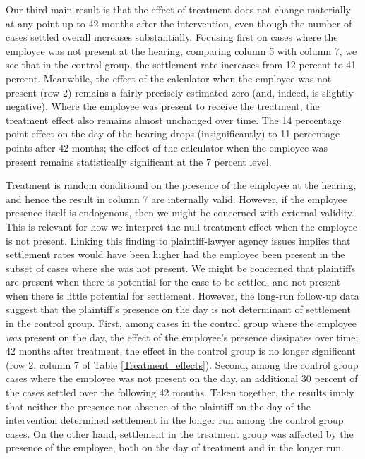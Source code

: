 \documentclass[11pt, a4paper]{article}
\begin{document}
Our third main result is that the effect of treatment does not change materially at any point up to 42 months after the intervention, even though the number of cases settled overall increases substantially. Focusing first on cases where the employee was not present at the hearing, comparing column 5 with column 7, we see that in the control group, the settlement rate increases from 12 percent to 41 percent. Meanwhile, the effect of the calculator when the employee was not present (row 2) remains a fairly precisely estimated zero (and, indeed, is slightly negative). Where the employee was present to receive the treatment, the treatment effect also remains almost unchanged over time. The 14 percentage point effect on the day of the hearing drops (insignificantly) to 11 percentage points after 42 months; the effect of the calculator when the employee was present remains statistically significant at the 7 percent level.

Treatment is random conditional on the presence of the employee at the hearing, and hence the result in column 7 are internally valid. However, if the employee presence itself is endogenous, then we might be concerned with external validity. This is relevant for how we interpret the null treatment effect when the employee is not present. Linking this finding to plaintiff-lawyer agency issues implies that settlement rates would have been higher had the employee been present in the subset of cases where she was not present. We might be concerned that plaintiffs are present when there is potential for the case to be settled, and not present when there is little potential for settlement. However, the long-run follow-up data suggest that the plaintiff's presence on the day is not determinant of settlement in the control group. First, among cases in the control group where the employee \textit{was} present on the day, the effect of the employee's presence dissipates over time; 42 months after treatment, the effect in the control group is no longer significant (row 2, column 7 of Table \ref{Treatment_effects}). %
Second, among the control group cases where the employee was not present on the day, an additional 30 percent of the cases settled over the following 42 months. Taken together, the results imply that neither the presence nor absence of the plaintiff on the day of the intervention determined settlement in the longer run among the control group cases. On the other hand, settlement in the treatment group was affected by the presence of the employee, both on the day of treatment and in the longer run. 
\end{document}
